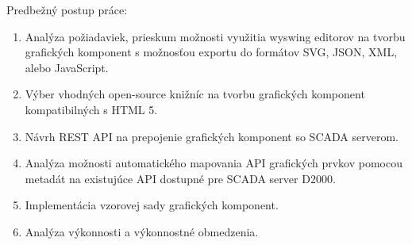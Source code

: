 Predbežný postup práce:

\begin{enumerate}
\item  Analýza požiadaviek, prieskum možnosti využitia wyswing editorov na tvorbu grafických komponent s možnosťou exportu do formátov SVG, JSON, XML, alebo JavaScript.
\item Výber vhodných open-source knižníc na tvorbu grafických komponent kompatibilných s HTML 5.
\item Návrh REST API na prepojenie grafických komponent so SCADA serverom.
\item  Analýza možnosti automatického mapovania API grafických prvkov pomocou metadát na existujúce API dostupné pre SCADA server D2000.
\item  Implementácia vzorovej sady grafických komponent.
\item  Analýza výkonnosti a výkonnostné obmedzenia.
\end{enumerate}

